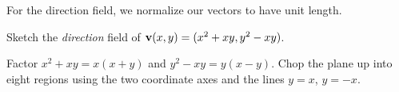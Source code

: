 \begin{solution}
\begin{center}
\end{center}

For the direction field, we normalize our vectors to have unit length.

\begin{center}
\end{center}
\end{solution}


\begin{question}
Sketch the \emph{direction} field of
$\mathbf{v}(x,y)=(x^2+xy,y^2-xy)$.
\end{question}

\begin{hint} 
Factor $x^2+xy=x(x+y)$ and $y^2-xy=y(x-y)$.
Chop the plane up into eight regions using the two coordinate axes and the lines $y=x$, $y=-x$.
\end{hint}

